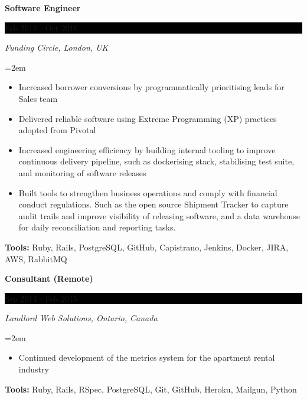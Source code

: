 \documentclass[paper=a4,fontsize=11pt]{scrartcl} %
\newcommand{\sepspace}{\vspace*{1em}}     %
\newcommand{\EducationEntry}[4]{
    \noindent \textbf{#1} \hfill        %
    \colorbox{Black}{
      \parbox{8.5em}{
      \hfill\color{White}#2}} \par      %
    \noindent \textit{#3} \par          %
    \noindent\hangindent=2em\hangafter=0 \small #4 %
    \normalsize \par}
\newcommand{\WorkEntry}[4]{             %
    \noindent \textbf{#1} \hfill        %
    \colorbox{Black}{%
      \parbox{9em}{%
      \hfill\color{White}#2}} \par      %
        \noindent \textit{#3} \par      %
    \noindent\hangindent=2em\hangafter=0 \small #4 %
    \normalsize \par}
\begin{document}
\WorkEntry{Software Engineer}{Feb 2015 - Oct 2016}
{Funding Circle, London, UK}
{
 \begin{itemize} \itemsep -1pt
   \item Increased borrower conversions by programmatically prioritising leads for Sales team
   \item Delivered reliable software using Extreme Programming (XP) practices adopted from Pivotal %
   \item Increased engineering efficiency by building internal tooling to improve continuous delivery pipeline,
         such as dockerising stack, stabilising test suite, and monitoring of software releases
   \item Built tools to strengthen business operations and comply with financial conduct regulations.
         Such as the open source Shipment Tracker %
         to capture audit trails and improve visibility of releasing software,
         and a data warehouse for daily reconciliation and reporting tasks.
 \end{itemize}
 \textbf{Tools:} Ruby, Rails, PostgreSQL, GitHub, Capistrano, Jenkins, Docker, JIRA, AWS, RabbitMQ
}
\sepspace

\WorkEntry{Consultant (Remote)}{Sep 2014 - Feb 2015}
{Landlord Web Solutions, Ontario, Canada}
{
 \begin{itemize} \itemsep -1pt
   \item Continued development of the metrics system for the apartment rental industry
 \end{itemize}
 \textbf{Tools:} Ruby, Rails, RSpec, PostgreSQL, Git, GitHub, Heroku, Mailgun, Python
}
\sepspace
\end{document}
